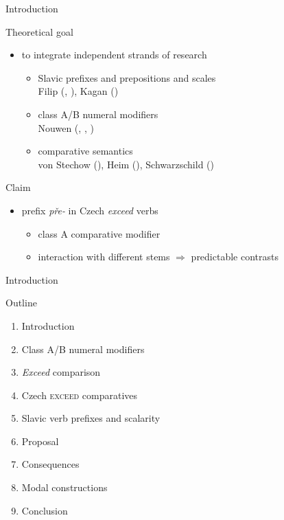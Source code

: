 \documentclass[12pt]{beamer}
\begin{document}
\begin{frame}{Introduction}

Theoretical goal

\begin{itemize}
\item to integrate independent strands of research
\begin{itemize}
\item Slavic prefixes and prepositions and scales\\
\scriptsize Filip (\citeyear{filip2000quantization}, \citeyear{filip2008events}), Kagan (\citeyear{kagan2013scalarity})\small
\item class A/B numeral modifiers\\
\scriptsize Nouwen (\citeyear{nouwen2008directionality}, \citeyear{nouwen2010two}, \citeyear{nouwen2015modified})\small
\item comparative semantics\\
\scriptsize von Stechow (\citeyear{von_stechow1984comparing}), Heim (\citeyear{heim2000degree}), Schwarzschild (\citeyear{schwarzschild2008semantics})\normalsize
\end{itemize}
\end{itemize}

Claim

\begin{itemize}
\item prefix \textit{pře-} in Czech \textit{exceed} verbs
\begin{itemize}
\item class A comparative modifier
\item interaction with different stems $\Rightarrow$ predictable contrasts
\end{itemize}

\end{itemize}


\end{frame}

\begin{frame}{Introduction}

Outline

\begin{enumerate}
\item Introduction
\item Class A/B numeral modifiers
\item \textit{Exceed} comparison
\item Czech \textsc{exceed} comparatives
\item Slavic verb prefixes and scalarity
\item Proposal
\item Consequences%
\item Modal constructions
\item Conclusion
\end{enumerate}

\end{frame}
\end{document}
